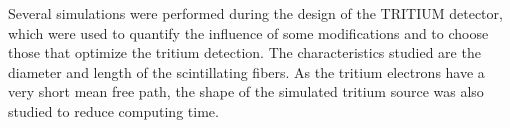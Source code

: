 Several simulations were performed during the design of the TRITIUM detector, which were used to quantify the influence of some modifications and to choose those that optimize the tritium detection. The characteristics studied are the diameter and length of the scintillating fibers. As the tritium electrons have a very short mean free path, the shape of the simulated tritium source was also studied to reduce computing time. 
